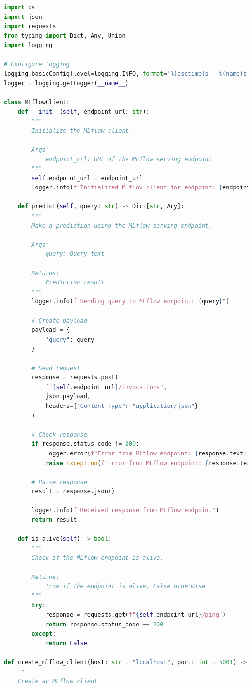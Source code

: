 \documentclass[
  screen,review,acmlarge]{acmart}
\begin{document}
\begin{lstlisting}[language=Python]
import os
import json
import requests
from typing import Dict, Any, Union
import logging

# Configure logging
logging.basicConfig(level=logging.INFO, format='%(asctime)s - %(name)s - %(levelname)s - %(message)s')
logger = logging.getLogger(__name__)

class MLflowClient:
    def __init__(self, endpoint_url: str):
        """
        Initialize the MLflow client.
        
        Args:
            endpoint_url: URL of the MLflow serving endpoint
        """
        self.endpoint_url = endpoint_url
        logger.info(f"Initialized MLflow client for endpoint: {endpoint_url}")
    
    def predict(self, query: str) -> Dict[str, Any]:
        """
        Make a prediction using the MLflow serving endpoint.
        
        Args:
            query: Query text
            
        Returns:
            Prediction result
        """
        logger.info(f"Sending query to MLflow endpoint: {query}")
        
        # Create payload
        payload = {
            "query": query
        }
        
        # Send request
        response = requests.post(
            f"{self.endpoint_url}/invocations",
            json=payload,
            headers={"Content-Type": "application/json"}
        )
        
        # Check response
        if response.status_code != 200:
            logger.error(f"Error from MLflow endpoint: {response.text}")
            raise Exception(f"Error from MLflow endpoint: {response.text}")
        
        # Parse response
        result = response.json()
        
        logger.info(f"Received response from MLflow endpoint")
        return result
    
    def is_alive(self) -> bool:
        """
        Check if the MLflow endpoint is alive.
        
        Returns:
            True if the endpoint is alive, False otherwise
        """
        try:
            response = requests.get(f"{self.endpoint_url}/ping")
            return response.status_code == 200
        except:
            return False

def create_mlflow_client(host: str = "localhost", port: int = 5001) -> MLflowClient:
    """
    Create an MLflow client.
    

\end{lstlisting}
\end{document}
